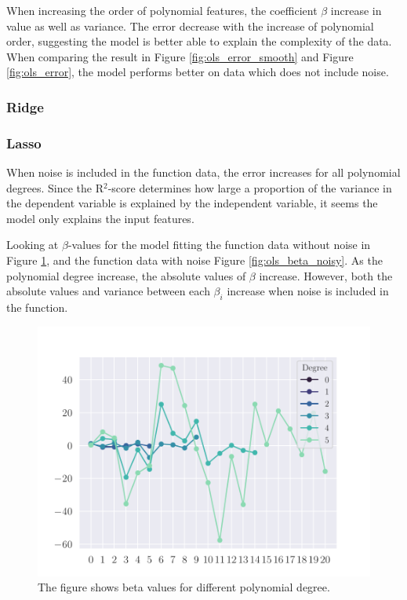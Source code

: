 When increasing the order of polynomial features, the coefficient $\beta$ increase in value as well as variance. The error decrease with the increase of polynomial order, suggesting the model is better able to explain the complexity of the data. When comparing the result in Figure \ref{fig:ols_error_smooth} and Figure \ref{fig:ols_error}, the model performs better on data which does not include noise. 








\subsubsection{Ridge}\label{sssec:ridge_synthetic}



\subsubsection{Lasso}\label{sssec:lasso_synthetic}








When noise is included in the function data, the error increases for all polynomial degrees. Since the R$^{2}$-score determines how large a proportion of the variance in the dependent variable is explained by the independent variable, it seems the model only explains the input features.

Looking at $\beta$-values for the model fitting the function data without noise in Figure \ref{fig:ols_beta}, and the function data with noise Figure \ref{fig:ols_beta_noisy}. As the polynomial degree increase, the absolute values of $\beta$ increase. However, both the absolute values and variance between each $\beta_{i}$ increase when noise is included in the function.  
\begin{figure}
    \centering
    \includegraphics[width=0.9\linewidth]{project-1/latex/figures/ols_beta.pdf}
    \caption{The figure shows beta values for different polynomial degree.}
    \label{fig:ols_beta}
\end{figure}

